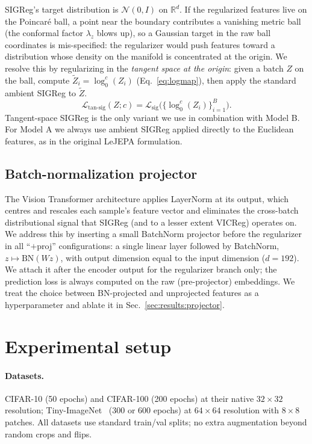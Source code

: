 \documentclass{article}
\begin{document}
SIGReg's target distribution is $\mathcal{N}(0, I)$ on $\mathbb{R}^d$. If the regularized features live on the Poincar\'{e} ball, a point near the boundary contributes a vanishing metric ball (the conformal factor $\lambda_z$ blows up), so a Gaussian target in the raw ball coordinates is mis-specified: the regularizer would push features toward a distribution whose density on the manifold is concentrated at the origin. We resolve this by regularizing in the \emph{tangent space at the origin}: given a batch $Z$ on the ball, compute $\tilde Z_i = \log^c_0(Z_i)$ (Eq.~\ref{eq:logmap}), then apply the standard ambient SIGReg to $\tilde Z$.
\begin{equation}
  \mathcal{L}_{\text{tan-sig}}(Z; c) = \mathcal{L}_{\text{sig}}\bigl(\{\log^c_0(Z_i)\}_{i=1}^B\bigr).
\end{equation}
Tangent-space SIGReg is the only variant we use in combination with Model B. For Model A we always use ambient SIGReg applied directly to the Euclidean features, as in the original LeJEPA formulation.

\subsection{Batch-normalization projector}
\label{sec:method:projector}

The Vision Transformer architecture applies LayerNorm at its output, which centres and rescales each sample's feature vector and eliminates the cross-batch distributional signal that SIGReg (and to a lesser extent VICReg) operates on. We address this by inserting a small BatchNorm projector before the regularizer in all ``$+$proj'' configurations: a single linear layer followed by BatchNorm, $z \mapsto \mathrm{BN}(W z)$, with output dimension equal to the input dimension ($d{=}192$). We attach it after the encoder output for the regularizer branch only; the prediction loss is always computed on the raw (pre-projector) embeddings. We treat the choice between BN-projected and unprojected features as a hyperparameter and ablate it in Sec.~\ref{sec:results:projector}.

\section{Experimental setup}
\label{sec:setup}

\paragraph{Datasets.}
CIFAR-10 (50 epochs) and CIFAR-100 (200 epochs) at their native $32{\times}32$ resolution; Tiny-ImageNet~\citep{le2015tinyimagenet} (300 or 600 epochs) at $64{\times}64$ resolution with $8{\times}8$ patches. All datasets use standard train/val splits; no extra augmentation beyond random crops and flips.
\end{document}
